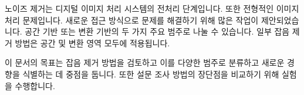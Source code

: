 노이즈 제거는 디지털 이미지 처리 시스템의 전처리 단계입니다. 또한 전형적인 이미지 처리 문제입니다. 새로운 접근 방식으로 문제를 해결하기 위해 많은 작업이 제안되었습니다. 공간 기반 또는 변환 기반의 두 가지 주요 범주로 나눌 수 있습니다. 일부 잡음 제거 방법은 공간 및 변환 영역 모두에 적용됩니다.

이 문서의 목표는 잡음 제거 방법을 검토하고 이를 다양한 범주로 분류하고 새로운 경향을 식별하는 데 중점을 둡니다. 또한 설문 조사 방법의 장단점을 비교하기 위해 실험을 수행합니다.